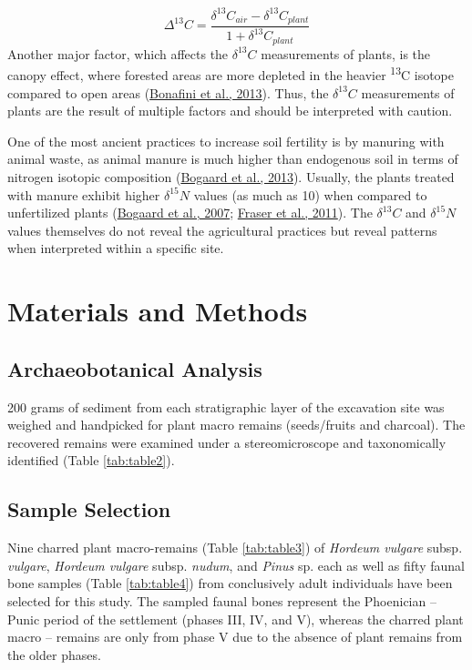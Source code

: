 \documentclass[preprint, 3p, authoryear]{elsarticle} %
\begin{document}
\[\Delta^{13}C = \frac{\delta ^{13}C_{air} - \delta ^{13}C_{plant}}{1+\delta ^{13}C_{plant}}\] Another major factor, which affects the \(\delta ^{13}C\) measurements of plants, is the canopy effect, where forested areas are more depleted in the heavier \textsuperscript{13}C isotope compared to open areas (\protect\hyperlink{ref-bonafini_etal13}{Bonafini et al., 2013}). Thus, the \(\delta ^{13}C\) measurements of plants are the result of multiple factors and should be interpreted with caution.

One of the most ancient practices to increase soil fertility is by manuring with animal waste, as animal manure is much higher than endogenous soil in terms of nitrogen isotopic composition (\protect\hyperlink{ref-bogaard_etal13}{Bogaard et al., 2013}). Usually, the plants treated with manure exhibit higher \(\delta ^{15}N\) values (as much as 10\text{\textperthousand}) when compared to unfertilized plants (\protect\hyperlink{ref-bogaard_etal07}{Bogaard et al., 2007}; \protect\hyperlink{ref-fraser_etal11}{Fraser et al., 2011}). The \(\delta ^{13}C\) and \(\delta ^{15}N\) values themselves do not reveal the agricultural practices but reveal patterns when interpreted within a specific site.

\hypertarget{materials-and-methods}{%
\section{Materials and Methods}\label{materials-and-methods}}

\hypertarget{archaeobotanical-analysis}{%
\subsection{Archaeobotanical Analysis}\label{archaeobotanical-analysis}}

200 grams of sediment from each stratigraphic layer of the excavation site was weighed and handpicked for plant macro remains (seeds/fruits and charcoal). The recovered remains were examined under a stereomicroscope and taxonomically identified (Table \ref{tab:table2}).

\hypertarget{sample-selection}{%
\subsection{Sample Selection}\label{sample-selection}}

Nine charred plant macro-remains (Table \ref{tab:table3}) of \emph{Hordeum vulgare} subsp. \emph{vulgare}, \emph{Hordeum vulgare} subsp. \emph{nudum}, and \emph{Pinus} sp. each as well as fifty faunal bone samples (Table \ref{tab:table4}) from conclusively adult individuals have been selected for this study. The sampled faunal bones represent the Phoenician -- Punic period of the settlement (phases III, IV, and V), whereas the charred plant macro -- remains are only from phase V due to the absence of plant remains from the older phases.
\end{document}
